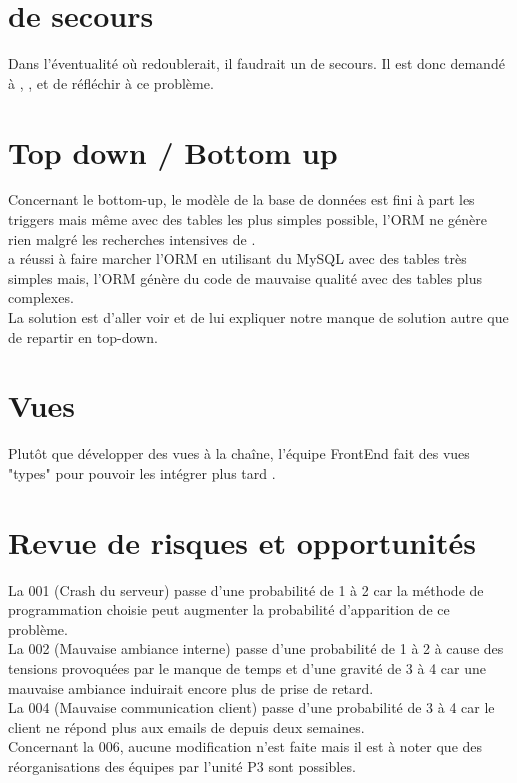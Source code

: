 \documentclass [a4paper] {article}
\begin{document}
\section{\CP{} de secours}
Dans l'éventualité où \Pierre{} redoublerait, il faudrait un \CP{} de secours. Il est donc demandé à \Florian, \Melissa, \Matthieu{} et \Julie{} de réfléchir à ce problème.


\section{Top down / Bottom up}
Concernant le bottom-up, le modèle de la base de données est fini à part les triggers mais même avec des tables les plus simples possible, l'ORM ne génère rien malgré les recherches intensives de \Michel. \\
\Kafui a réussi à faire marcher l'ORM en utilisant du MySQL avec des tables très simples mais, l'ORM génère du code de mauvaise qualité avec des tables plus complexes. \\
La solution est d'aller voir \nomTuteurPedago{} et de lui expliquer notre manque de solution autre que de repartir en top-down.


\section{Vues}
Plutôt que développer des vues à la chaîne, l'équipe FrontEnd fait des vues "types" pour pouvoir les intégrer plus tard . 


\section{Revue de risques et opportunités}

La \FDR{} 001 (Crash du serveur) passe d'une probabilité de 1 à 2 car la méthode de programmation choisie peut augmenter la probabilité d'apparition de ce problème. \\

La \FDR{} 002 (Mauvaise ambiance interne) passe d'une probabilité de 1 à 2 à cause des tensions provoquées par le manque de temps et d'une gravité de 3 à 4 car une mauvaise ambiance induirait encore plus de prise de retard.\\

La \FDR{} 004 (Mauvaise communication client) passe d'une probabilité de 3 à 4 car le client ne répond plus aux emails de \Sergi{} depuis deux semaines.\\

Concernant la \FDR{} 006, aucune modification n'est faite mais il est à noter que des réorganisations des équipes par l'unité P3 sont possibles.\\
\end{document}

